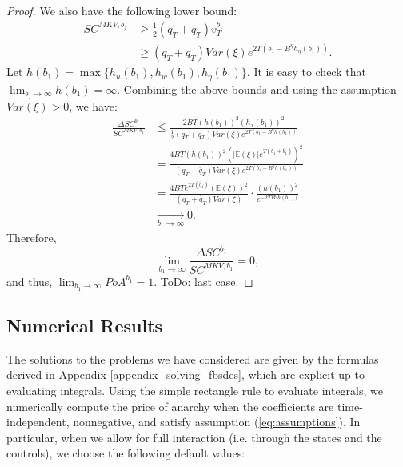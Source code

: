 \documentclass[11pt]{article}
\begin{document}
\begin{proof}
    We also have the following lower bound:
    \begin{equation*}
	\begin{split}
	SC^{MKV,b_1} &\geq \frac{1}{2}(q_T+\bar{q}_T)v^{b_1}_T \\
	& \geq (q_T+\bar{q}_T)Var(\xi)e^{2T(b_1-B^{\eta}h_{\eta}(b_1))}.
	\end{split}
    \end{equation*}
    Let $h(b_1)=\max \{h_u(b_1),h_w(b_1),h_{\eta}(b_1) \}$. It is easy to check that $\lim_{b_1 \to \infty}h(b_1)=\infty$. Combining the above bounds and using the assumption $Var(\xi)>0$, we have:
    \begin{equation*}
    \begin{split}
	    \frac{\Delta SC^{b_1}}{SC^{MKV,b_1}}&\leq \frac{2BT(h(b_1))^2 (h_{\bar{x}}(b_1))^2}{\frac{1}{2}(q_T+\bar{q}_T)Var(\xi)e^{2T(b_1-B^{\eta}h(b_1))}}\\
	    &= \frac{4BT(h(b_1))^2 (\left| \mathbb{E}(\xi)\right| e^{T(b_1+\bar{b}_1)})^2}{(q_T+\bar{q}_T)Var(\xi)e^{2T(b_1-B^{\eta}h(b_1))}}\\
	    &= \frac{4BTe^{2T(\bar{b}_1)}(\mathbb{E}(\xi))^2  }{(q_T+\bar{q}_T)Var(\xi)} \cdot \frac{(h(b_1))^2}{e^{-2TB^{\eta}h(b_1))}}\\
	    &\xrightarrow[b_1 \to \infty ]{} 0.
    \end{split}
    \end{equation*}
    Therefore,
    \begin{equation*}
	    \lim_{b_1 \to \infty}\frac{\Delta SC^{b_1}}{SC^{MKV,b_1}}=0,
    \end{equation*}
    and thus, $\lim_{b_1 \to \infty} PoA^{b_1}=1$. ToDo: last case.

\end{proof}


\subsection{\textbf{Numerical Results}}
The solutions to the problems we have considered are given by the formulas derived in Appendix \ref{appendix_solving_fbsdes}, which are explicit up to evaluating integrals. Using the simple rectangle rule to evaluate integrals, we numerically compute the price of anarchy when the coefficients are time-independent, nonnegative, and satisfy assumption (\ref{eq:assumptions}). In particular, when we allow for full interaction (i.e. through the states and the controls), we choose the following default values:
\end{document}
